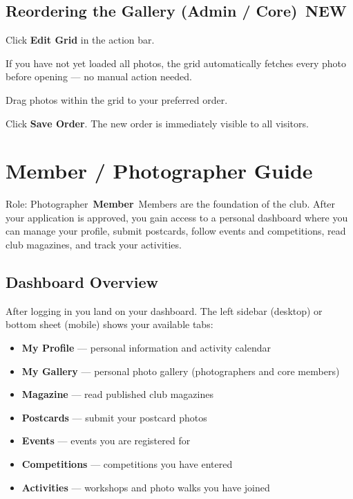 \documentclass[12pt,a4paper]{article}
\newcommand{\rolebadge}[2]{%
  \colorbox{#1}{\color{white}\,\textbf{\footnotesize #2}\,}%
}
\newcommand{\newbadge}{%
  \colorbox{NewFrame}{\color{white}\,\textbf{\footnotesize NEW}\,}%
}
\begin{document}
\subsection{Reordering the Gallery (Admin / Core) \newbadge}

\begin{steps}
\item Click \textbf{Edit Grid} in the action bar.
\item If you have not yet loaded all photos, the grid automatically fetches every photo before opening --- no manual action needed.
\item Drag photos within the grid to your preferred order.
\item Click \textbf{Save Order}. The new order is immediately visible to all visitors.
\end{steps}

\section{Member / Photographer Guide}
\label{sec:member}

\begin{rolebox}[MemberColor]{Role: Photographer \rolebadge{MemberColor}{Member}}
Members are the foundation of the club. After your application is approved, you gain access to a personal dashboard where you can manage your profile, submit postcards, follow events and competitions, read club magazines, and track your activities.
\end{rolebox}

\subsection{Dashboard Overview}

After logging in you land on your dashboard. The left sidebar (desktop) or bottom sheet (mobile) shows your available tabs:

\begin{itemize}
  \item \textbf{My Profile} --- personal information and activity calendar
  \item \textbf{My Gallery} --- personal photo gallery (photographers and core members)
  \item \textbf{Magazine} --- read published club magazines
  \item \textbf{Postcards} --- submit your postcard photos
  \item \textbf{Events} --- events you are registered for
  \item \textbf{Competitions} --- competitions you have entered
  \item \textbf{Activities} --- workshops and photo walks you have joined
\end{itemize}
\end{document}
